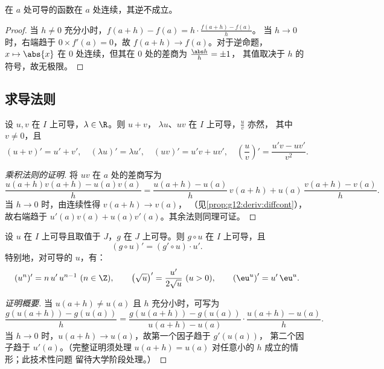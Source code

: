 \begin{proposition}\label{prop:g12:deriv:diffcont}
在 $a$ 处可导的函数在 $a$ 处连续，其逆不成立。
\end{proposition}

\begin{proof}
当 $h \neq 0$ 充分小时，$f(a+h) - f(a) = h \cdot \frac{f(a+h)-f(a)}{h}$。
当 $h \to 0$ 时，右端趋于 $0 \times f'(a) = 0$，故
$f(a+h) \to f(a)$。对于逆命题，$x \mapsto \abs{x}$ 在
$0$ 处连续，但其在 $0$ 处的差商为 $\frac{\abs h}{h} = \pm 1$，
其值取决于 $h$ 的符号，故无极限。
\end{proof}

\subsection{求导法则}

\begin{proposition}[运算法则]\label{prop:g12:deriv:operations}
设 $u, v$ 在 $I$ 上可导，$\lambda \in \R$。则 $u + v$，
$\lambda u$、$uv$ 在 $I$ 上可导，$\frac{u}{v}$ 亦然，
其中 $v \neq 0$，且
\[
(u+v)' = u' + v', \quad (\lambda u)' = \lambda u', \quad
(uv)' = u'v + uv', \quad
\left(\frac{u}{v}\right)' = \frac{u'v - uv'}{v^2}.
\]
\end{proposition}

\begin{proof}[乘积法则的证明]
将 $uv$ 在 $a$ 处的差商写为
\[
\frac{u(a+h)v(a+h) - u(a)v(a)}{h}
= \frac{u(a+h) - u(a)}{h}\,v(a+h) + u(a)\,\frac{v(a+h) - v(a)}{h}.
\]
当 $h \to 0$ 时，由连续性得 $v(a+h) \to v(a)$，
（见\cref{prop:g12:deriv:diffcont}），故右端趋于
$u'(a)v(a) + u(a)v'(a)$。其余法则同理可证。
\end{proof}

\begin{theorem}[链式法则]\label{thm:g12:deriv:chain}
设 $u$ 在 $I$ 上可导且取值于 $J$，$g$ 在
$J$ 上可导。则 $g \circ u$ 在 $I$ 上可导，且
\[
(g \circ u)' = (g' \circ u) \cdot u' .
\]
特别地，对可导的 $u$，有：
\[
(u^n)' = n\,u'\,u^{n-1} \ (n \in \Z), \qquad
\left(\sqrt{u}\right)' = \frac{u'}{2\sqrt{u}} \ (u > 0), \qquad
\left(\eu^{u}\right)' = u'\,\eu^{u}.
\]
\end{theorem}

\begin{proof}[证明概要]
当 $u(a+h) \neq u(a)$ 且 $h$ 充分小时，可写为
\[
\frac{g(u(a+h)) - g(u(a))}{h}
= \frac{g(u(a+h)) - g(u(a))}{u(a+h) - u(a)} \cdot \frac{u(a+h) - u(a)}{h}.
\]
当 $h \to 0$ 时，$u(a+h) \to u(a)$，故第一个因子趋于 $g'(u(a))$，
第二个因子趋于 $u'(a)$。（完整证明须处理
$u(a+h) = u(a)$ 对任意小的 $h$ 成立的情形；此技术性问题
留待大学阶段处理。）
\end{proof}

